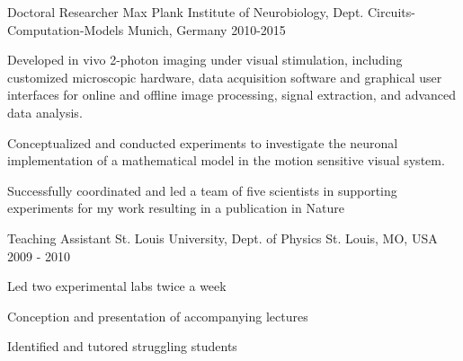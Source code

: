 


\begin{cventries}


\cventry
{Doctoral Researcher} %
{Max Plank Institute of Neurobiology, Dept. Circuits-Computation-Models} %
{Munich, Germany} %
{2010-2015} %
{ %
\begin{cvitems}
\item {Developed in vivo 2-photon imaging under visual stimulation, including customized microscopic hardware, data acquisition software and graphical user interfaces for online and offline image processing, signal extraction, and advanced data analysis.}
\item {Conceptualized and conducted experiments to investigate the neuronal implementation of a mathematical model in the motion sensitive visual system.}
\item {Successfully coordinated and led a team of five scientists in supporting experiments for my work resulting in a publication in Nature%
}
\end{cvitems}
}


\cventry
{Teaching Assistant} %
{St. Louis University, Dept. of Physics} %
{St. Louis, MO, USA} %
{2009 - 2010} %
{ %
\begin{cvitems}
\item {Led two experimental labs twice a week}
\item {Conception and presentation of accompanying lectures}
\item{Identified and tutored struggling students}
\end{cvitems}
}


\end{cventries}
